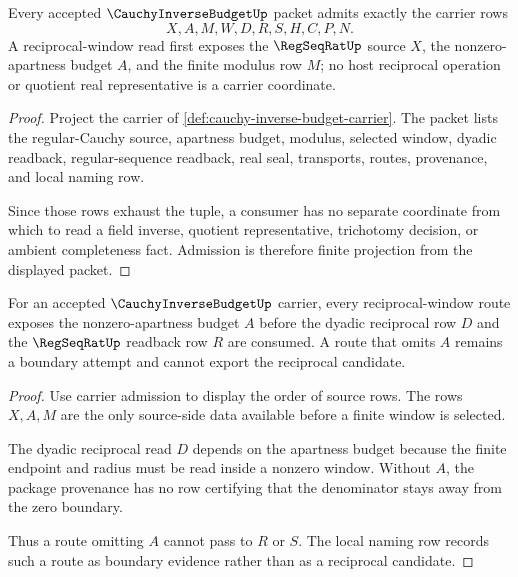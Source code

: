 \begin{theorem}
\label{thm:cauchy-inverse-budget-carrier-admission}
Every accepted $\CauchyInverseBudgetUp$ packet admits exactly the carrier rows
$$
X,A,M,W,D,R,S,H,C,P,N.
$$
A reciprocal-window read first exposes the $\RegSeqRatUp$ source $X$, the nonzero-apartness budget $A$, and the finite modulus row $M$; no host reciprocal operation or quotient real representative is a carrier coordinate.
\end{theorem}
\begin{proof}
Project the carrier of \autoref{def:cauchy-inverse-budget-carrier}. The packet lists the regular-Cauchy source, apartness budget, modulus, selected window, dyadic readback, regular-sequence readback, real seal, transports, routes, provenance, and local naming row.

Since those rows exhaust the tuple, a consumer has no separate coordinate from which to read a field inverse, quotient representative, trichotomy decision, or ambient completeness fact. Admission is therefore finite projection from the displayed packet.
\end{proof}

\begin{theorem}
\label{thm:cauchy-inverse-budget-apartness-exposure}
For an accepted $\CauchyInverseBudgetUp$ carrier, every reciprocal-window route exposes the nonzero-apartness budget $A$ before the dyadic reciprocal row $D$ and the $\RegSeqRatUp$ readback row $R$ are consumed. A route that omits $A$ remains a boundary attempt and cannot export the reciprocal candidate.
\end{theorem}
\begin{proof}
Use carrier admission to display the order of source rows. The rows $X,A,M$ are the only source-side data available before a finite window is selected.

The dyadic reciprocal read $D$ depends on the apartness budget because the finite endpoint and radius must be read inside a nonzero window. Without $A$, the package provenance has no row certifying that the denominator stays away from the zero boundary.

Thus a route omitting $A$ cannot pass to $R$ or $S$. The local naming row records such a route as boundary evidence rather than as a reciprocal candidate.
\end{proof}

